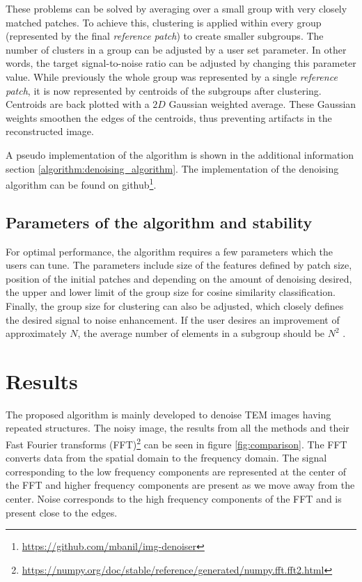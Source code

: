 \documentclass[fleqn,10pt]{wlscirep}
\begin{document}
	These problems can be solved by averaging over a small group with very closely matched patches. To achieve this, clustering is applied within every group (represented by the final \textit{reference patch}) to create smaller subgroups. The number of clusters in a group can be adjusted by a user set parameter. In other words, the target signal-to-noise ratio can be adjusted by changing this parameter value. While previously the whole group was represented by a single \textit{reference patch}, it is now represented by centroids of the subgroups after clustering. Centroids are back plotted with a $2D$ Gaussian weighted average. These Gaussian weights smoothen the edges of the centroids, thus preventing artifacts in the reconstructed image. 
	
	A pseudo implementation of the algorithm is shown in the additional information section \ref{algorithm:denoising_algorithm}. The implementation of the denoising algorithm can be found on github\footnote{\url{https://github.com/mbanil/img-denoiser}}.
	
	\subsection*{Parameters of the algorithm and stability}
	
	For optimal performance, the algorithm requires a few parameters which the users can tune. The parameters include size of the features defined by patch size, position of the initial patches and depending on the amount of denoising desired, the upper and lower limit of the group size for cosine similarity classification. Finally, the group size for clustering can also be adjusted, which closely defines the desired signal to noise enhancement. If the user desires an improvement of approximately $N$, the average number of elements in a subgroup should be $N^2$ \cite{bcm_nlm}.
	
	\section*{Results}
	
	The proposed algorithm is mainly developed to denoise TEM images having repeated structures. The noisy image, the results from all the methods and their Fast Fourier transforms (FFT)\footnote{\url{https://numpy.org/doc/stable/reference/generated/numpy.fft.fft2.html}} can be seen in figure \ref{fig:comparison}. The FFT converts data from the spatial domain to the frequency domain. The signal corresponding to the low frequency components are represented at the center of the FFT and higher frequency components are present as we move away from the center. Noise corresponds to the high frequency components of the FFT and is present close to the edges.
	
\end{document}

